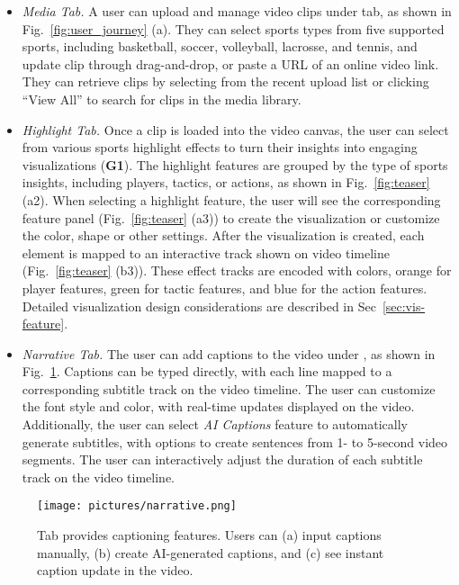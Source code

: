 \begin{itemize}[leftmargin=*]
    \item \emph{Media Tab.} A user can upload and manage video clips under \Media{} tab, as shown in Fig.~\ref{fig:user_journey} (a). They can select sports types from five supported sports, including basketball, soccer, volleyball, lacrosse, and tennis, and update clip through drag-and-drop, or paste a URL of an online video link. They can retrieve  clips by selecting from the recent upload list or clicking ``View All'' to search for clips in the media library. 
    
    \item  \emph{Highlight Tab.} Once a clip is loaded into the video canvas, the user can select from various sports highlight effects to turn their insights into engaging visualizations (\textbf{G1}). The highlight features are grouped by the type of sports insights, including players, tactics, or actions, as shown in Fig.~\ref{fig:teaser} (a2). When selecting a highlight feature, the user will see the corresponding feature panel (Fig.~\ref{fig:teaser} (a3)) to create the visualization or customize the color, shape or other settings. After the visualization is created, each element is mapped to an interactive track shown on video timeline (Fig.~\ref{fig:teaser} (b3)). These effect tracks are encoded with colors, orange for player features, green for tactic features, and blue for the action features.
    Detailed visualization design considerations are described in Sec~\ref{sec:vis-feature}.
    
    \item  \emph{Narrative Tab.} The user can add captions to the video under \Narrative{}, as shown in Fig.~\ref{fig:narrative}. Captions can be typed directly, with each line mapped to a corresponding subtitle track on the video timeline. The user can customize the font style and color, with real-time updates displayed on the video. Additionally, the user can select \textit{AI Captions} feature to automatically generate subtitles, with options to create sentences from 1- to 5-second video segments.
The user can interactively adjust the duration of each subtitle track on the video timeline. 
\end{itemize}

\begin{figure}[t!]
    \centering
    \texttt{[image: pictures/narrative.png]}
     \vspace{-6mm}
    \caption{\Narrative{} Tab provides captioning features. Users can (a) input captions manually, (b) create AI-generated captions, and (c) see instant caption update in the video.} 
    \label{fig:narrative}
    \vspace{-3mm}
\end{figure}

